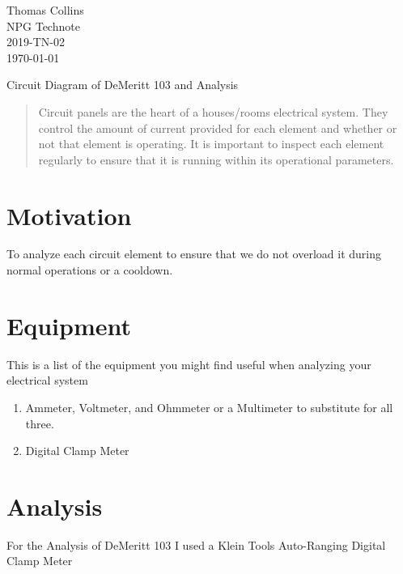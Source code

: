 \documentclass[12pt,epsfig]{article}
\begin{document}
\pagestyle{empty}
\renewcommand{\thefootnote}{\fnsymbol{footnote}}

\begin{flushright}
{\small
Thomas Collins\\
NPG Technote \\ 
2019-TN-02\\
\today\\}
\end{flushright}

\vspace{.5cm}

\begin{center}
Circuit Diagram of DeMeritt 103 and Analysis 
\end{center}
\vspace{.5cm}

\begin{abstract}
Circuit panels are the heart of a houses/rooms electrical system. They control the amount of current provided for each element and whether or not that element is operating. It is important to inspect each element regularly to ensure that it is running within its operational parameters.
\end{abstract}



\section{Motivation}

To analyze each circuit element to ensure that we do not overload it during normal operations or a cooldown. 

\section{Equipment}
This is a list of the equipment you might find useful when analyzing your electrical system 
\begin{enumerate}
\item Ammeter, Voltmeter, and Ohmmeter or a Multimeter to substitute for all three. 
\item Digital Clamp Meter 
\end{enumerate}
 

\section{Analysis}
For the Analysis of DeMeritt 103 I used a Klein Tools Auto-Ranging Digital Clamp Meter
\end{document}
